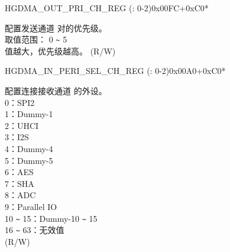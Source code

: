 \begin{register}{H}{GDMA\_OUT\_PRI\_CH\_REG (: 0-2)}{0x00FC+0xC0*}\label{regdesc:GDMAOUTPRICHNREG}
%
%
\regnewline%
\begin{regdesc}\begin{reglist}
\label{fielddesc:GDMATXPRICHN}\item [GDMA\_TX\_PRI\_CH\regindex{n}] 配置发送通道  对的优先级。\\
取值范围： 0 \verb+~+ 5\\
值越大，优先级越高。 (R/W)
\end{reglist}\end{regdesc}
\end{register}


\begin{register}{H}{GDMA\_IN\_PERI\_SEL\_CH\_REG (: 0-2)}{0x00A0+0xC0*}\label{regdesc:GDMAINPERISELCHNREG}
%
%
\regnewline%
\begin{regdesc}\begin{reglist}
\label{fielddesc:GDMAPERIINSELCHN}\item [GDMA\_PERI\_IN\_SEL\_CH\regindex{n}] 配置连接接收通道  的外设。\\
0：SPI2\\
1：Dummy-1\\
2：UHCI\\
3：I2S\\
4：Dummy-4\\
5：Dummy-5\\
6：AES\\
7：SHA\\
8：ADC\\
9：Parallel IO\\
10 \verb+~+ 15：Dummy-10  \verb+~+  15\\
16 \verb+~+ 63：无效值\\
(R/W)
\end{reglist}\end{regdesc}
\end{register}


